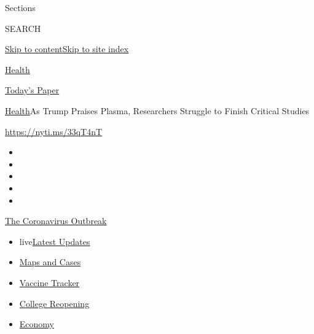 Sections

SEARCH

\protect\hyperlink{site-content}{Skip to
content}\protect\hyperlink{site-index}{Skip to site index}

\href{https://www.nytimes3xbfgragh.onion/section/health}{Health}

\href{https://myaccount.nytimes3xbfgragh.onion/auth/login?response_type=cookie\&client_id=vi}{}

\href{https://www.nytimes3xbfgragh.onion/section/todayspaper}{Today's
Paper}

\href{/section/health}{Health}\textbar{}As Trump Praises Plasma,
Researchers Struggle to Finish Critical Studies

\url{https://nyti.ms/33qT4nT}

\begin{itemize}
\item
\item
\item
\item
\item
\end{itemize}

\href{https://www.nytimes3xbfgragh.onion/news-event/coronavirus?action=click\&pgtype=Article\&state=default\&region=TOP_BANNER\&context=storylines_menu}{The
Coronavirus Outbreak}

\begin{itemize}
\tightlist
\item
  live\href{https://www.nytimes3xbfgragh.onion/2020/08/04/world/coronavirus-cases.html?action=click\&pgtype=Article\&state=default\&region=TOP_BANNER\&context=storylines_menu}{Latest
  Updates}
\item
  \href{https://www.nytimes3xbfgragh.onion/interactive/2020/us/coronavirus-us-cases.html?action=click\&pgtype=Article\&state=default\&region=TOP_BANNER\&context=storylines_menu}{Maps
  and Cases}
\item
  \href{https://www.nytimes3xbfgragh.onion/interactive/2020/science/coronavirus-vaccine-tracker.html?action=click\&pgtype=Article\&state=default\&region=TOP_BANNER\&context=storylines_menu}{Vaccine
  Tracker}
\item
  \href{https://www.nytimes3xbfgragh.onion/2020/08/02/us/covid-college-reopening.html?action=click\&pgtype=Article\&state=default\&region=TOP_BANNER\&context=storylines_menu}{College
  Reopening}
\item
  \href{https://www.nytimes3xbfgragh.onion/live/2020/08/04/business/stock-market-today-coronavirus?action=click\&pgtype=Article\&state=default\&region=TOP_BANNER\&context=storylines_menu}{Economy}
\end{itemize}

